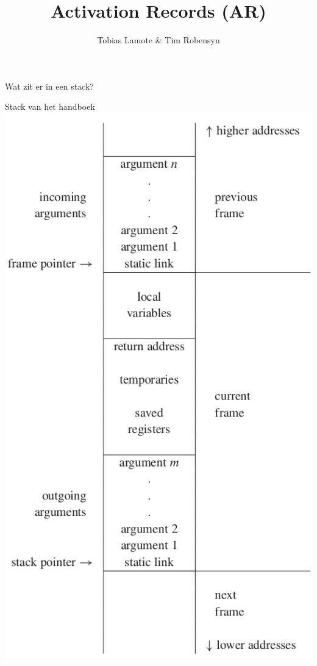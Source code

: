 \documentclass{beamer}
\title{Activation Records (AR)}
\author{Tobias Lamote \& Tim Robensyn}
\begin{document}
	
\begin{frame}[plain]
    \maketitle
\end{frame}

\begin{frame}
	Wat zit er in een stack?
\end{frame}

\begin{frame}{Stack van het handboek}
	\includegraphics[height=\textheight]{theoretical_stack.png}
\end{frame}
\end{document}
